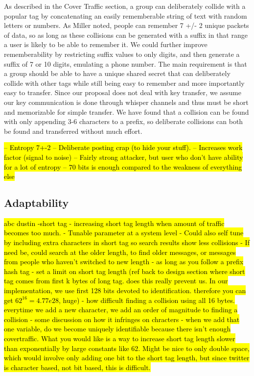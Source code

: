As described in the Cover Traffic section, a group can deliberately collide with a popular tag by concatenating an easily rememberable string of text with random letters or numbers. As Miller\cite{miller56} noted, people can remember  
7 +/- 2 unique packets of data, so as long as these collisions can be generated with a suffix in that range a user is likely to be able to remember it. We could further improve rememberability by restricting suffix values to only digits, and then generate a suffix of 7 or 10 digits, emulating a phone number. The main requirement is that a group should be able to have a unique shared secret that can deliberately collide with other tags while still being easy to remember and more importantly easy to transfer. Since our proposal does not deal with key transfer, we assume our key communication is done through whisper channels and thus must be short and memorizable for simple transfer. We have found that a collision can be found with only appending 3-6 characters to a prefix, so deliberate collisions can both be found and transferred without much effort.

\hl{
-- Entropy 7+-2
-- Deliberate posting crap (to hide your stuff).
-- Increases work factor (signal to noise)
-- Fairly strong attacker, but user who don't have ability for a lot of entropy
-- 70 bits is enough compared to the weakness of everything else
}

\subsection{Adaptability}

\hl{abc
dustin
-short tag
- increasing short tag length when amount of traffic becomes too much.
- Tunable parameter at a system level
- Could also self tune by including extra characters in short tag so search results show less collisions
- If need be, could search at the older length, to find older messages, or messages from people who haven't switched to new length
- as long as you follow a prefix hash tag
- set a limit on short tag length (ref back to design section where short tag comes from first k bytes of long tag. does this really prevent us. In our implementation, we use first 128 bits devoted to identification. therefore you can get $62^16= 4.77e28$, huge)
- how difficult finding a collision using all 16 bytes. everytime we add a new character, we add an order of magnitude to finding a collision 
- some discussion on how it infringes on chracters
- when we add that one variable, do we become uniquely identifiable because there isn't enough covertraffic. What you would like is a way to increase short tag length slower than exponentially by large constants like 62. Might be nice to only double space, which would involve only adding one bit to the short tag length, but since twitter is character based, not bit based, this is difficult.
}

